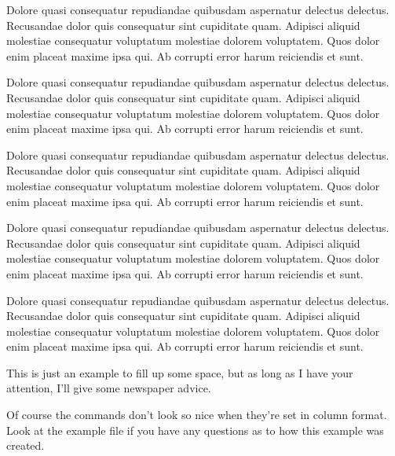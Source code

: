 \documentclass{article}
\date{\today}
\begin{document}
\maketitle

\begin{multicols}{2}{


\Large

Dolore quasi consequatur repudiandae quibusdam aspernatur delectus delectus. Recusandae dolor quis consequatur sint cupiditate quam. Adipisci aliquid molestiae consequatur voluptatum molestiae dolorem voluptatem. Quos dolor enim placeat maxime ipsa qui. Ab corrupti error harum reiciendis et sunt.

Dolore quasi consequatur repudiandae quibusdam aspernatur delectus delectus. Recusandae dolor quis consequatur sint cupiditate quam. Adipisci aliquid molestiae consequatur voluptatum molestiae dolorem voluptatem. Quos dolor enim placeat maxime ipsa qui. Ab corrupti error harum reiciendis et sunt.

Dolore quasi consequatur repudiandae quibusdam aspernatur delectus delectus. Recusandae dolor quis consequatur sint cupiditate quam. Adipisci aliquid molestiae consequatur voluptatum molestiae dolorem voluptatem. Quos dolor enim placeat maxime ipsa qui. Ab corrupti error harum reiciendis et sunt.

Dolore quasi consequatur repudiandae quibusdam aspernatur delectus delectus. Recusandae dolor quis consequatur sint cupiditate quam. Adipisci aliquid molestiae consequatur voluptatum molestiae dolorem voluptatem. Quos dolor enim placeat maxime ipsa qui. Ab corrupti error harum reiciendis et sunt.

Dolore quasi consequatur repudiandae quibusdam aspernatur delectus delectus. Recusandae dolor quis consequatur sint cupiditate quam. Adipisci aliquid molestiae consequatur voluptatum molestiae dolorem voluptatem. Quos dolor enim placeat maxime ipsa qui. Ab corrupti error harum reiciendis et sunt.

\closearticle

This is just an example to fill up some space, but as long as I have your attention, I'll give some newspaper advice.


Of course the commands don't look so nice when they're set in column format.  Look at the example file if you have any questions as to how this example was created.

\closearticle
}
\end{multicols}
\end{document}
